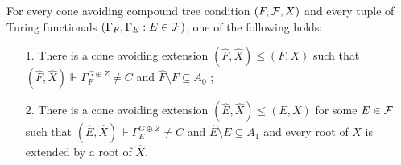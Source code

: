 \begin{lemma}\label{lem:mtt1-sca-forcing-requirement}
For every cone avoiding compound tree condition $(F, \mathcal{F}, X)$ and every tuple of Turing functionals $( \Gamma_F, \Gamma_E: E \in \mathcal{F} )$, one of the following holds:
\begin{itemize}
	\item[1.] There is a cone avoiding extension $(\hat{F}, \hat{X}) \leq (F, X)$
	such that $(\hat{F}, \hat{X}) \Vdash \Gamma^{G \oplus Z}_F \neq C$ and $\hat{F} \setminus F \subseteq A_0$ ;
	\item[2.] There is a cone avoiding extension $(\hat{E}, \hat{X}) \leq (E, X)$ for some $E \in \mathcal{F}$
	such that $(\hat{E}, \hat{X}) \Vdash \Gamma^{G \oplus Z}_E \neq C$ and $\hat{E} \setminus E \subseteq A_1$ and every root of $X$ is extended by a root of $\hat{X}$.
\end{itemize}
\end{lemma}
